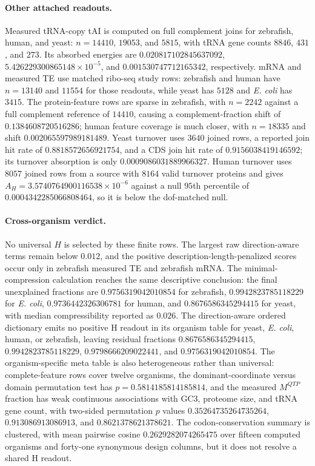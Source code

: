 \paragraph{Other attached readouts.}
Measured tRNA-copy tAI is computed on full complement joins for zebrafish, human, and yeast: $n=14410$, $19053$, and $5815$, with tRNA gene counts $8846$, $431$, and $273$.  Its absorbed energies are $0.020817102845637092$, $5.426229300865148\times 10^{-5}$, and $0.001530747712165342$, respectively.  mRNA and measured TE use matched ribo-seq study rows: zebrafish and human have $n=13140$ and $11554$ for those readouts, while yeast has $5128$ and \emph{E. coli} has $3415$.  The protein-feature rows are sparse in zebrafish, with $n=2242$ against a full complement reference of $14410$, causing a complement-fraction shift of $0.1384608720516286$; human feature coverage is much closer, with $n=18335$ and shift $0.002065597989181489$.  Yeast turnover uses $3640$ joined rows, a reported join hit rate of $0.8818572656921754$, and a CDS join hit rate of $0.9156038419146592$; its turnover absorption is only $0.0009086031889966327$.  Human turnover uses $8057$ joined rows from a source with $8164$ valid turnover proteins and gives $A_H=3.5740764900116538\times 10^{-6}$ against a null $95$th percentile of $0.0004342285066808464$, so it is below the dof-matched null.

\paragraph{Cross-organism verdict.}
No universal $H$ is selected by these finite rows.  The largest raw direction-aware terms remain below $0.012$, and the positive description-length-penalized scores occur only in zebrafish measured TE and zebrafish mRNA.  The minimal-compression calculation reaches the same descriptive conclusion: the final unexplained fractions are $0.9756319042010854$ for zebrafish, $0.9942823785118229$ for \emph{E. coli}, $0.9736442326306781$ for human, and $0.8676586345294415$ for yeast, with median compressibility reported as $0.026$.  The direction-aware ordered dictionary emits no positive H readout in its organism table for yeast, \emph{E. coli}, human, or zebrafish, leaving residual fractions $0.8676586345294415$, $0.9942823785118229$, $0.9798666209022441$, and $0.9756319042010854$.  The organism-specific meta table is also heterogeneous rather than universal: complete-feature rows cover twelve organisms, the dominant-coordinate versus domain permutation test has $p=0.5814185814185814$, and the measured $M^{QTP}$ fraction has weak continuous associations with GC3, proteome size, and tRNA gene count, with two-sided permutation $p$ values $0.35264735264735264$, $0.913086913086913$, and $0.8621378621378621$.  The codon-conservation summary is clustered, with mean pairwise cosine $0.2629282074265475$ over fifteen computed organisms and forty-one synonymous design columns, but it does not resolve a shared H readout.

